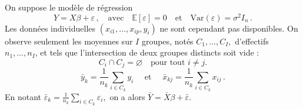 \documentclass{../headers/td_upc}
\providecommand{\1}{\mathds{1}}
\begin{document}
	 On suppose le modèle de régression
	\[
	Y = X \beta + \varepsilon\,,
	\quad \text{avec} \quad
	\mathbb{E}[\varepsilon]=0
	\quad \text{et} \quad \text{Var}(\varepsilon)=\sigma^{2} I_{n}\,.
	\]
	Les données individuelles $\left(x_{i 1}, \ldots, x_{i p}, y_{i}\right)$ ne sont cependant pas disponibles.
	On observe seulement les moyennes sur $I$ groupes, notés $C_{1}, \ldots, C_{I},$
	d'effectifs $n_{1}, \ldots, n_{I}$, et tels que l'intersection de deux groupes distincts soit vide : 
	\[ C_i \cap C_j = \varnothing \quad   \text{pour tout } i \neq j. \]
	\[
	\bar{y}_{k}=\frac{1}{n_{k}} \sum_{i \in C_{k}} y_{i}
	\quad \text { et } \quad
	\bar{x}_{k j}=\frac{1}{n_{k}} \sum_{i \in C_{k}} x_{i j}\,.
	\]
	En notant $\bar{\varepsilon}_{k}=\frac{1}{n_{k}} \sum_{i \in C_{k}} \varepsilon_{i},$
	on a alors $\bar{Y}=\bar{X} \beta+\bar{\varepsilon}$.
\end{document}

